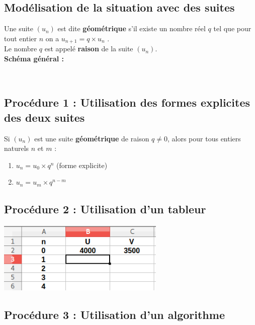 \documentclass[a4paper,11pt,cours]{nsi} %
\begin{document}
\subsection*{Modélisation de la situation avec des suites}
\begin{definition}[ ]
	Une suite $(u_n)$ est dite \textbf{géométrique} s'il existe un nombre réel $q$ tel que pour tout entier $n$ on a $u_{n+1}=q \times u_n$ .\\
	Le nombre $q$ est appelé \textbf{raison} de la suite $(u_n)$.\\[.5em]
	\textbf{Schéma général :}
	\vspace{2cm}
\end{definition}
\newpage
{}\\



\subsection*{Procédure 1 : Utilisation des formes explicites des deux suites}
\begin{propriete}[ ]
	Si $(u_n)$ est une suite \textbf{géométrique} de raison $q\neq 0$, alors pour tous entiers naturels $n$ et $m$ :
	\begin{enumerate}[label=\textbullet]
		\item 	$u_n = u_0\times q^n $  \hspace{.5cm}(forme explicite)
		\item 	$u_n=u_m\times q^{n-m}$	
	\end{enumerate}
\end{propriete}

\begin{multicols}{2}
	\subsection*{Procédure 2 : Utilisation d'un tableur}
	\includegraphics[width=8cm]{tableur2}\\
	
	\vspace{2cm}
	
	\subsection*{Procédure 3 : Utilisation d'un algorithme}
\end{multicols}
\end{document}
